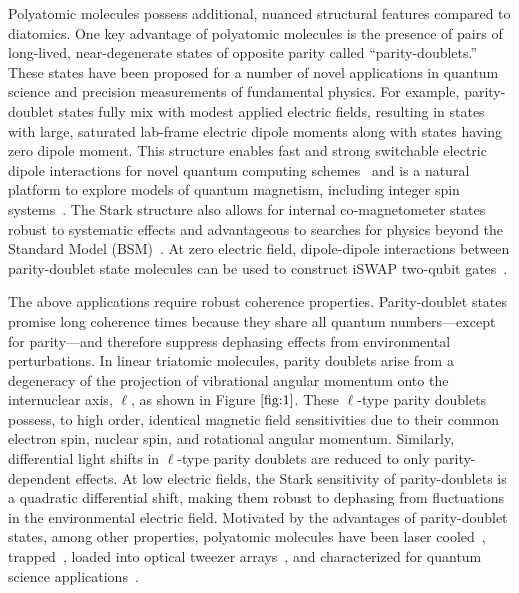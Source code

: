 \documentclass[
superscriptaddress,
twocolumn,
amsmath,amssymb,
aps,
prx,
nofootinbib,
]{revtex4-2}
\begin{document}
Polyatomic molecules possess additional, nuanced structural features compared to diatomics. One key advantage of polyatomic molecules is the presence of pairs of long-lived, near-degenerate states of opposite parity called ``parity-doublets.'' These states have been proposed for a number of novel applications in quantum science and precision measurements of fundamental physics. For example, parity-doublet states fully mix with modest applied electric fields, resulting in states with large, saturated lab-frame electric dipole moments along with states having zero dipole moment. This structure enables fast and strong switchable electric dipole interactions for novel quantum computing schemes~\cite{wei2011entanglement, Yu2019} and is a natural platform to explore models of quantum magnetism, including integer spin systems~\cite{Wall2013, Wall2015, wall2015quantum}. The Stark structure also allows for internal co-magnetometer states robust to systematic effects and advantageous to searches for physics beyond the Standard Model (BSM)~\cite{kozyryev2017PolyEDM,Hutzler2020,takahashi2023engineering,takahashi2025engineered}. At zero electric field, dipole-dipole interactions between parity-doublet state molecules can be used to construct iSWAP two-qubit gates~\cite{holland2023demand,bao2023dipolar,picard2025entanglement,ruttley2025long}.

The above applications require robust coherence properties. Parity-doublet states promise long coherence times because they share all quantum numbers—except for parity—and therefore suppress dephasing effects from environmental perturbations. In linear triatomic molecules, parity doublets arise from a degeneracy of the projection of vibrational angular momentum onto the internuclear axis, $\ell$, as shown in Figure $\ref{fig:1}$. These $\ell$-type parity doublets possess, to high order, identical magnetic field sensitivities due to their common electron spin, nuclear spin, and rotational angular momentum. Similarly, differential light shifts in $\ell$-type parity doublets are reduced to only parity-dependent effects. At low electric fields, the Stark sensitivity of parity-doublets is a quadratic differential shift, making them robust to dephasing from fluctuations in the environmental electric field. Motivated by the advantages of parity-doublet states, among other properties, polyatomic molecules have been laser cooled~\cite{kozyryev2016Sisyphus,augenbraun2023review}, trapped~\cite{Zeppenfeld2012Sisyphus,prehn2016,liu2017magnetic,vilas2022magneto,hallas2022optical,Lasner2024MOT,sawaoka2025optical}, loaded into optical tweezer arrays~\cite{VilasOpticalTweezer2024}, and characterized for quantum science applications~\cite{anderegg2023quantum,low2025coherence}.
\end{document}
